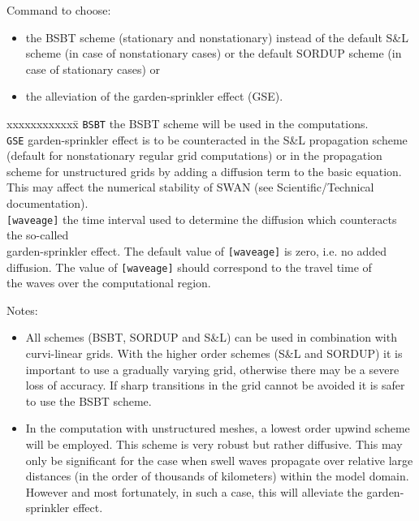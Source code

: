 \documentclass[12pt]{book}
\begin{document}
\noindent
Command to choose:
\begin{itemize}
  \item the BSBT scheme (stationary and nonstationary) instead of the default S\&L scheme (in case
        of nonstationary cases) or the default SORDUP scheme (in case of stationary cases) or
  \item the alleviation of the garden-sprinkler effect (GSE).
\end{itemize}
\begin{tabbing}
xxxxxxxxxxxx\= \kill
{\tt BSBT}      \> the BSBT scheme will be used in the computations.\\
{\tt GSE}       \> garden-sprinkler effect is to be counteracted in the S\&L propagation scheme\+\\
                   (default for nonstationary regular grid computations) or in the propagation\\
                   scheme for unstructured grids by adding a diffusion term to the basic equation.\\
                   This may affect the numerical stability of SWAN (see Scientific/Technical\\
                   documentation).\-\\
{\tt [waveage]} \> the time interval used to determine the diffusion which counteracts the so-called\+\\
                   garden-sprinkler effect. The default value of {\tt [waveage]} is zero, i.e. no added\\
                   diffusion. The value of {\tt [waveage]} should correspond to the travel time of\\
                   the waves over the computational region.\-\\
\end{tabbing}
Notes:
\begin{itemize}
  \item All schemes (BSBT, SORDUP and S\&L) can be used in combination with curvi-linear grids. With the
        higher order schemes (S\&L and SORDUP) it is important to use a gradually varying grid, otherwise there
        may be a severe loss of accuracy. If sharp transitions in the grid cannot be avoided it is safer to use
        the BSBT scheme.
  \item In the computation with unstructured meshes, a lowest order upwind scheme will be employed. This
        scheme is very robust but rather diffusive. This may only be significant for the case when swell
        waves propagate over relative large distances (in the order of thousands of kilometers) within the
        model domain. However and most fortunately, in such a case, this will alleviate the garden-sprinkler effect.
\end{itemize}
\end{document}
